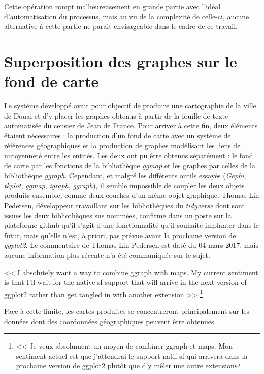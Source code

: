 Cette opération rompt malheureusement en grande partie avec l'idéal d'automatisation du processus, mais au vu de la complexité de celle-ci, aucune alternative à cette partie ne parait envisageable dans le cadre de ce travail.

\section{Superposition des graphes sur le fond de carte}
Le système développé avait pour objectif de produire une cartographie de la ville de Douai et d'y placer les graphes obtenus à partir de la fouille de texte automatisée du censier de Jean de France. Pour arriver à cette fin, deux éléments étaient nécessaires : la production d'un fond de carte avec un système de références géographiques et la production de graphes modélisant les liens de mitoyenneté entre les entités. Les deux ont pu être obtenus séparément : le fond de carte par les fonctions de la bibliothèque \textit{ggmap} et les graphes par celles de la bibliothèque \textit{ggraph}. Cependant, et malgré les différents outils essayés (\textit{Gephi}, \textit{tkplot}, \textit{ggmap}, \textit{igraph}, \textit{ggraph}), il semble impossible de coupler les deux objets produits ensemble, comme deux couches d'un même objet graphique. Thomas Lin Pedersen, développeur travaillant sur les bibliothèques du \textit{tidyverse} dont sont issues les deux bibliothèques sus nommées, confirme dans un poste sur la plateforme github qu'il s'agit d'une fonctionnalité qu'il souhaite implanter dans le futur, mais qu'elle n'est, à priori, pas prévue avant la prochaine version de \textit{ggplot2}. Le commentaire de Thomas Lin Pedersen est daté du 04 mars 2017, mais aucune information plus récente n'a été communiquée sur le sujet.

\begin{displayquote}
    << I absolutely want a way to combine ggraph with maps. My current sentiment is that I'll wait for the native sf support that will arrive in the next version of ggplot2 rather than get tangled in with another extension >> 
     \footnote{ << Je veux absolument un moyen de combiner ggraph et maps. Mon sentiment actuel est que j'attendrai le support natif sf qui arrivera dans la prochaine version de ggplot2 plutôt que d'y mêler une autre extension}
\end{displayquote} 
\vspace{0,5cm}
Face à cette limite, les cartes produites se concentreront principalement sur les données dont des coordonnées géographiques peuvent être obtenues.


